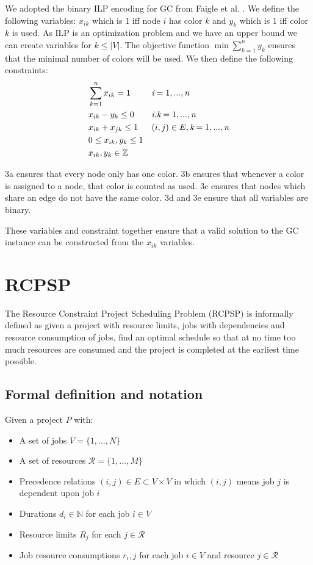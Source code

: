 \documentclass{sig-alternate}
\begin{document}
We adopted the binary ILP encoding for GC from Faigle et al. \cite{faigle2002mathprogramming}. 
We define the following variables: $x_{ik}$ which is $1$ iff node $i$ has color $k$ and $y_k$ which is $1$ iff color $k$ is used.
As ILP is an optimization problem and we have an upper bound we can create variables for $k \leq |V|$.
The objective function $\min \sum\limits_{k=1}^n y_k$ ensures that the minimal number of colors will be used.
We then define the following constraints:
\begin{subequations}
\begin{align}
& \sum\limits_{k=1}^n \emph{$x_{ik}$} = 1 & & \emph{i} = 1,...,\emph{n} \\
& \emph{$x_{ik}$} - \emph{$y_k$} \leq 0 & & \emph{i,k} = 1,...,\emph{n} \\
&  \emph{$x_{ik}$} + \emph{$x_{jk}$} \leq 1 & & (i,j) \in E, \emph{k} = 1,...,\emph{n} \\
& 0 \leq \emph{$x_{ik}$}, \emph{$y_k$} \leq 1 & & \\
& \emph{$x_{ik}$}, \emph{$y_k$} \in \mathbb{Z} & &
\end{align}
\end{subequations}

3a ensures that every node only has one color.
3b ensures that whenever a color is assigned to a node, that color is counted as used.
3c ensures that nodes which share an edge do not have the same color.
3d and 3e ensure that all variables are binary.

These variables and constraint together ensure that a valid solution to the GC instance can be constructed from the $x_{ik}$ variables.

\section{RCPSP}
\label{sec:RCPSP}
The Resource Constraint Project Scheduling Problem (RCPSP) is informally defined as given a project with resource limits, jobs with dependencies and resource consumption of jobs, find an optimal schedule so that at no time too much resources are consumed and the project is completed at the earliest time possible.

\subsection{Formal definition and notation}
Given a project $P$ with:
\begin{itemize}
\item A set of jobs $V = \{1,\ldots,N\}$ 
\item A set of resources $\mathcal{R} = \{1,\ldots,M\}$
\item Precedence relations $(i,j) \in E \subset V \times V$ in which $(i,j)$ means job $j$ is dependent upon job $i$
\item Durations $d_i \in \mathbb{N}$ for each job $i \in V$
\item Resource limits $R_j$ for each $j \in \mathcal{R}$
\item Job resource consumptions $r_i,j$ for each job $i \in V$ and resource $j \in \mathcal{R}$
\end{itemize}
\end{document}
